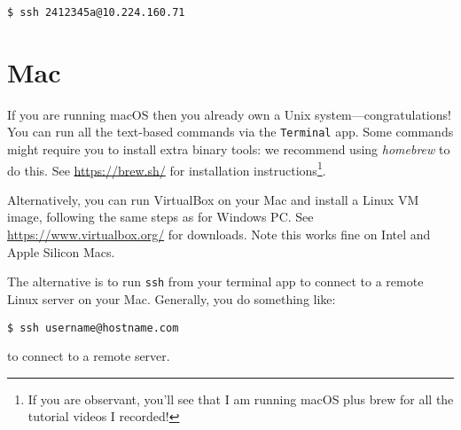 \documentclass{article}
\begin{document}
\begin{lstlisting}[style=BashInputStyle]
  $ ssh 2412345a@10.224.160.71
\end{lstlisting}





\section*{Mac}

If you are running macOS then you already own a Unix system---congratulations!
You can run all the text-based commands via the \texttt{Terminal}
app. Some commands might require you to install extra binary tools:
we recommend using \textit{homebrew} to do this. See \url{https://brew.sh/} for installation instructions\footnote{If
you are observant, you'll see that I am running macOS plus brew for all
the tutorial videos I recorded!}.

Alternatively, you can run VirtualBox on your Mac and install a
Linux VM image, following the same steps as for Windows PC.
See \url{https://www.virtualbox.org/} for downloads. Note this works fine
on Intel and Apple Silicon Macs.

The alternative is to run \texttt{ssh} from your terminal app
to connect to a remote Linux server on your Mac. Generally, you
do something like:

\begin{lstlisting}[style=BashInputStyle]
  $ ssh username@hostname.com
\end{lstlisting}

to connect to a remote server.
\end{document}
